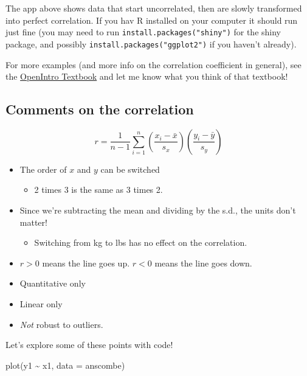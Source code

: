 \documentclass[
  letterpaper,
  DIV=11,
  numbers=noendperiod]{scrreprt}
\newenvironment{Shaded}{\begin{snugshade}}{\end{snugshade}}
\newcommand{\AttributeTok}[1]{\textcolor[rgb]{0.40,0.45,0.13}{#1}}
\newcommand{\FunctionTok}[1]{\textcolor[rgb]{0.28,0.35,0.67}{#1}}
\newcommand{\NormalTok}[1]{\textcolor[rgb]{0.00,0.23,0.31}{#1}}
\newcommand{\SpecialCharTok}[1]{\textcolor[rgb]{0.37,0.37,0.37}{#1}}
\providecommand{\tightlist}{%
  \setlength{\itemsep}{0pt}\setlength{\parskip}{0pt}}\usepackage{longtable,booktabs,array}
\begin{document}
The app above shows data that start uncorrelated, then are slowly
transformed into perfect correlation. If you hav R installed on your
computer it should run just fine (you may need to run
\texttt{install.packages("shiny")} for the shiny package, and possibly
\texttt{install.packages("ggplot2")} if you haven't already).

For more examples (and more info on the correlation coefficient in
general), see the
\href{https://www.openintro.org/book/biostat/}{OpenIntro Textbook} and
let me know what you think of that textbook!

\hypertarget{comments-on-the-correlation}{%
\subsection{Comments on the
correlation}\label{comments-on-the-correlation}}

\[
r = \frac{1}{n-1}\sum_{i=1}^n\left(\frac{x_i - \bar x}{s_x}\right)\left(\frac{y_i - \bar y}{s_y}\right)
\]

\begin{itemize}
\tightlist
\item
  The order of \(x\) and \(y\) can be switched

  \begin{itemize}
  \tightlist
  \item
    2 times 3 is the same as 3 times 2.
  \end{itemize}
\item
  Since we're subtracting the mean and dividing by the s.d., the units
  don't matter!

  \begin{itemize}
  \tightlist
  \item
    Switching from kg to lbs has no effect on the correlation.
  \end{itemize}
\item
  \(r>0\) means the line goes up. \(r < 0\) means the line goes down.
\item
  Quantitative only
\item
  Linear only
\item
  \emph{Not} robust to outliers.
\end{itemize}

Let's explore some of these points with code!

\begin{Shaded}
\begin{Highlighting}[]
\FunctionTok{plot}\NormalTok{(y1 }\SpecialCharTok{\textasciitilde{}}\NormalTok{ x1, }\AttributeTok{data =}\NormalTok{ anscombe)}
\end{Highlighting}
\end{Shaded}
\end{document}
